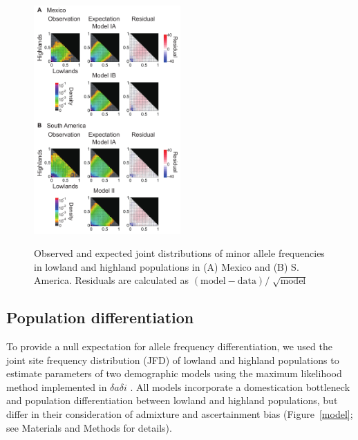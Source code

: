 \begin{figure}[tb]   
  \begin{center}
   \vspace{-0mm}
   \includegraphics[width=0.5\textwidth]{fig/Fig4}
   \renewcommand{\baselinestretch}{0.9}
   \vspace{-3mm}
   \caption{Observed and expected joint distributions of minor allele frequencies in lowland and highland populations in (A) Mexico and (B) S. America. Residuals are calculated as  $(\mbox{model}-\mbox{data})/\sqrt[]{\mbox{model}}$}
\vspace{-6mm}
    \label{JFD}
  \end{center}
\end{figure}

\subsection*{Population differentiation}

To provide a null expectation for allele frequency differentiation, we used the joint site frequency distribution (JFD) of lowland and highland populations to estimate parameters of two demographic models  using the maximum likelihood method implemented in $\delta a \delta i$ \cite[]{Gutenkunst_2009_19851460}.  
All models incorporate a domestication bottleneck \cite[]{Wright_2005_15919994} and population differentiation between lowland and highland populations, but differ in their consideration of admixture and ascertainment bias (Figure~\ref{model}; see Materials and Methods for details).

